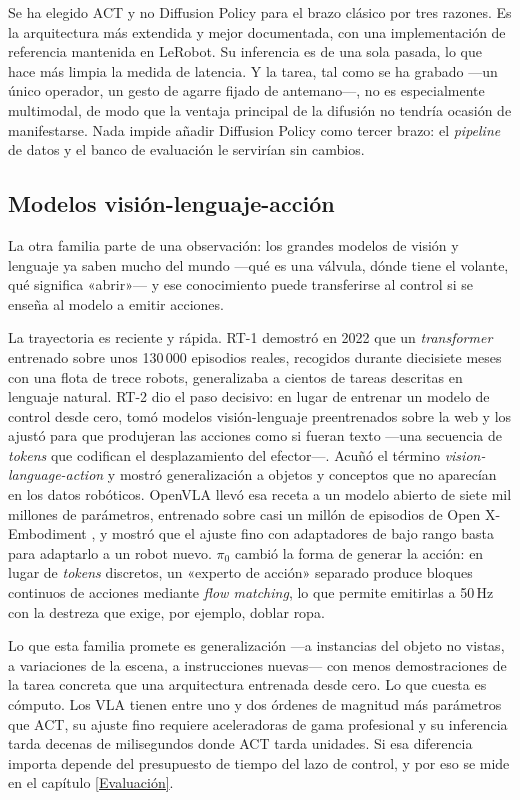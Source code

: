 Se ha elegido ACT y no Diffusion Policy para el brazo clásico por tres razones. Es la arquitectura
más extendida y mejor documentada, con una implementación de referencia mantenida en LeRobot. Su
inferencia es de una sola pasada, lo que hace más limpia la medida de latencia. Y la tarea, tal como
se ha grabado —un único operador, un gesto de agarre fijado de antemano—, no es especialmente
multimodal, de modo que la ventaja principal de la difusión no tendría ocasión de manifestarse.
Nada impide añadir Diffusion Policy como tercer brazo: el \textit{pipeline} de datos y el banco de evaluación
le servirían sin cambios.

\subsection{Modelos visión-lenguaje-acción}

La otra familia parte de una observación: los grandes modelos de visión y lenguaje ya saben mucho
del mundo —qué es una válvula, dónde tiene el volante, qué significa «abrir»— y ese conocimiento
puede transferirse al control si se enseña al modelo a emitir acciones.

La trayectoria es reciente y rápida. RT-1 \cite{brohan2022rt1} demostró en 2022 que un
\textit{transformer} entrenado sobre unos 130\,000 episodios reales, recogidos durante diecisiete
meses con una flota de trece robots, generalizaba a cientos de tareas descritas en lenguaje natural.
RT-2 \cite{brohan2023rt2} dio el paso decisivo: en lugar de entrenar un modelo de control desde cero,
tomó modelos visión-lenguaje preentrenados sobre la web y los ajustó para que produjeran las
acciones como si fueran texto —una secuencia de \textit{tokens} que codifican el desplazamiento del
efector—. Acuñó el término \textit{vision-language-action} y mostró generalización a objetos y
conceptos que no aparecían en los datos robóticos. OpenVLA \cite{kim2024openvla} llevó esa receta a
un modelo abierto de siete mil millones de parámetros, entrenado sobre casi un millón de episodios
de Open X-Embodiment \cite{oxe2023}, y mostró que el ajuste fino con adaptadores de bajo rango basta
para adaptarlo a un robot nuevo. $\pi_0$ \cite{black2024pi0} cambió la forma de generar la acción: en
lugar de \textit{tokens} discretos, un «experto de acción» separado produce bloques continuos de
acciones mediante \textit{flow matching}, lo que permite emitirlas a 50\,Hz con la destreza que
exige, por ejemplo, doblar ropa.

Lo que esta familia promete es generalización —a instancias del objeto no vistas, a variaciones de
la escena, a instrucciones nuevas— con menos demostraciones de la tarea concreta que una
arquitectura entrenada desde cero. Lo que cuesta es cómputo. Los VLA tienen entre uno y dos órdenes
de magnitud más parámetros que ACT, su ajuste fino requiere aceleradoras de gama profesional y su
inferencia tarda decenas de milisegundos donde ACT tarda unidades. Si esa diferencia importa depende
del presupuesto de tiempo del lazo de control, y por eso se mide en el capítulo \ref{Evaluación}.

